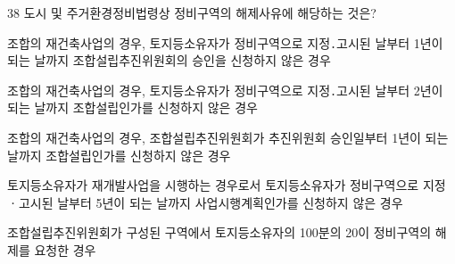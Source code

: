 \begin{question}{38}
도시 및 주거환경정비법령상 정비구역의 해제사유에 해당하는 것은?
\begin{choices}
  \item 조합의 재건축사업의 경우, 토지등소유자가 정비구역으로 지정․고시된 날부터 1년이 되는 날까지 조합설립추진위원회의 승인을 신청하지 않은 경우
  \item 조합의 재건축사업의 경우, 토지등소유자가 정비구역으로 지정․고시된 날부터 2년이 되는 날까지 조합설립인가를 신청하지 않은 경우
  \item 조합의 재건축사업의 경우, 조합설립추진위원회가 추진위원회 승인일부터 1년이 되는 날까지 조합설립인가를 신청하지 않은 경우
  \item 토지등소유자가 재개발사업을 시행하는 경우로서 토지등소유자가 정비구역으로 지정ㆍ고시된 날부터 5년이 되는 날까지 사업시행계획인가를 신청하지 않은 경우
  \item 조합설립추진위원회가 구성된 구역에서 토지등소유자의 100분의 20이 정비구역의 해제를 요청한 경우
\end{choices}
\end{question}
